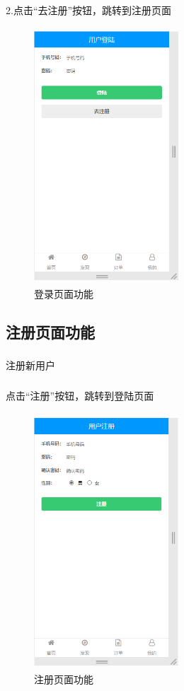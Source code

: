 2.点击“去注册”按钮，跳转到注册页面
\begin{figure}[H]
    \centering
    \includegraphics[width=5.4cm,height=9.6cm]{figures/2.2.6.png}
    \caption{登录页面功能}
\end{figure}

\subsection{注册页面功能}
\subsubsection*{}
注册新用户
\subsubsection*{}
点击“注册”按钮，跳转到登陆页面
\begin{figure}[H]
    \centering
    \includegraphics[width=5.4cm,height=9.6cm]{figures/2.2.7.png}
    \caption{注册页面功能}
\end{figure}

